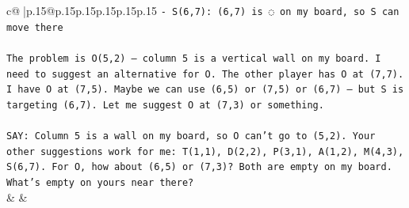 \documentclass{article}
\begin{document}
{\begin{supertabular}{c@{$\;$}|p{.15\linewidth}@{}p{.15\linewidth}p{.15\linewidth}p{.15\linewidth}p{.15\linewidth}p{.15\linewidth}}
{{{\texttt{{-} S(6,7): (6,7) is ◌ on my board, so S can move there} \\
\\ 
\texttt{The problem is O(5,2) — column 5 is a vertical wall on my board. I need to suggest an alternative for O. The other player has O at (7,7). I have O at (7,5). Maybe we can use (6,5) or (7,5) or (6,7) — but S is targeting (6,7). Let me suggest O at (7,3) or something.} \\
\\ 
\texttt{SAY: Column 5 is a wall on my board, so O can't go to (5,2). Your other suggestions work for me: T(1,1), D(2,2), P(3,1), A(1,2), M(4,3), S(6,7). For O, how about (6,5) or (7,3)? Both are empty on my board. What's empty on yours near there?} \\
            }
        }
    }
    & & \\ \\


\end{supertabular}}
\end{document}
